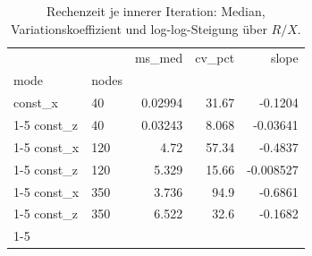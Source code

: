 \begin{table}[htbp]
\centering
\caption{Rechenzeit je innerer Iteration: Median, Variationskoeffizient und log-log-Steigung \"uber $R/X$.}
\label{tab:rx-timing}
\begin{tabular}{llrrr}
\toprule
 &  & ms_med & cv_pct & slope \\
mode & nodes &  &  &  \\
\midrule
const_x & 40 & 0.02994 & 31.67 & -0.1204 \\
\cline{1-5}
const_z & 40 & 0.03243 & 8.068 & -0.03641 \\
\cline{1-5}
const_x & 120 & 4.72 & 57.34 & -0.4837 \\
\cline{1-5}
const_z & 120 & 5.329 & 15.66 & -0.008527 \\
\cline{1-5}
const_x & 350 & 3.736 & 94.9 & -0.6861 \\
\cline{1-5}
const_z & 350 & 6.522 & 32.6 & -0.1682 \\
\cline{1-5}
\bottomrule
\end{tabular}
\end{table}
